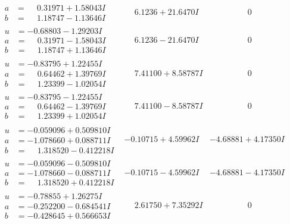 \documentclass[1p]{elsarticle_modified}
\theoremstyle{definition}
\begin{document}
$$\begin{array}{c|c|c}
\begin{aligned}
a &= \phantom{-}0.31971 + 1.58043 I \\
b &= \phantom{-}1.18747 - 1.13646 I\end{aligned}
 & \phantom{-}6.1236 + 21.6470 I & \phantom{-0.000000 } 0 \\ \hline\begin{aligned}
u &= -0.68803 - 1.29203 I \\
a &= \phantom{-}0.31971 - 1.58043 I \\
b &= \phantom{-}1.18747 + 1.13646 I\end{aligned}
 & \phantom{-}6.1236 - 21.6470 I & \phantom{-0.000000 } 0 \\ \hline\begin{aligned}
u &= -0.83795 + 1.22455 I \\
a &= \phantom{-}0.64462 + 1.39769 I \\
b &= \phantom{-}1.23399 - 1.02054 I\end{aligned}
 & \phantom{-}7.41100 + 8.58787 I & \phantom{-0.000000 } 0 \\ \hline\begin{aligned}
u &= -0.83795 - 1.22455 I \\
a &= \phantom{-}0.64462 - 1.39769 I \\
b &= \phantom{-}1.23399 + 1.02054 I\end{aligned}
 & \phantom{-}7.41100 - 8.58787 I & \phantom{-0.000000 } 0 \\ \hline\begin{aligned}
u &= -0.059096 + 0.509810 I \\
a &= -1.078660 + 0.088711 I \\
b &= \phantom{-}1.318520 - 0.412218 I\end{aligned}
 & -0.10715 + 4.59962 I & -4.68881 + 4.17350 I \\ \hline\begin{aligned}
u &= -0.059096 - 0.509810 I \\
a &= -1.078660 - 0.088711 I \\
b &= \phantom{-}1.318520 + 0.412218 I\end{aligned}
 & -0.10715 - 4.59962 I & -4.68881 - 4.17350 I \\ \hline\begin{aligned}
u &= -0.78855 + 1.26275 I \\
a &= -0.252200 - 0.684541 I \\
b &= -0.428645 + 0.566653 I\end{aligned}
 & \phantom{-}2.61750 + 7.35292 I & \phantom{-0.000000 } 0 \\ \hline\begin{aligned}

\end{aligned}
\end{array}$$
\end{document}
